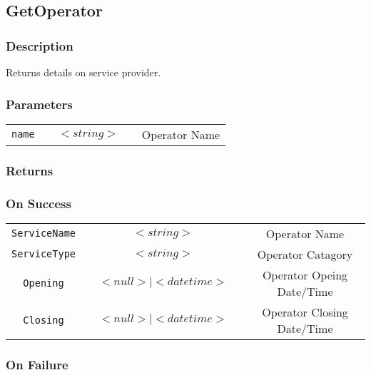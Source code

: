 \subsection{GetOperator}

\subsubsection{Description}

Returns details on service provider.

\subsubsection{Parameters}

\begin{tabular}{ccccc}
\verb!name! & \vspace{15mm} & $<string>$ & \vspace{15mm} & Operator Name \\
\end{tabular}

\subsubsection{Returns}

\subsubsection{On Success}

\begin{tabular}{ccccc}
\verb!ServiceName! & \vspace{15mm} & $<string>$ & \vspace{15mm} & Operator Name \\
\verb!ServiceType! & \vspace{15mm} & $<string>$ & \vspace{15mm} & Operator Catagory \\
\verb!Opening! & \vspace{15mm} & $<null> \mid <datetime>$ & \vspace{15mm} & Operator Opeing Date/Time \\
\verb!Closing! & \vspace{15mm} & $<null> \mid <datetime>$ & \vspace{15mm} & Operator Closing Date/Time \\
\end{tabular}

\subsubsection{On Failure}


